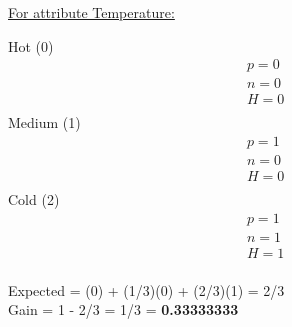 \documentclass[8pt, fullpage,letterpaper]{article}
\begin{document}
\begin{enumerate}
\begin{enumerate}
\begin{enumerate}
\begin{enumerate}
\begin{itemize}
						\underline {For attribute Temperature:} 
							\vspace{-5pt}
							\begin{multicols}{3}
								Hot (0)
			 						\begin{align*}
									    	& p = 0\\
										& n = 0 \\
									    	& H = 0\\
								      \end{align*}
								Medium (1)
			 						\begin{align*}
									    	& p = 1\\
										& n = 0 \\
									    	& H = 0\\
								      \end{align*}
								Cold (2)
			 						\begin{align*}
									    	& p = 1\\
										& n = 1 \\
									    	& H = 1\\
								      \end{align*}
							\end{multicols}
							\vspace{-20pt}
							Expected = (0) + (1/3)(0) + (2/3)(1) = 2/3\\
							Gain = 1 - 2/3 = 1/3 = {\bf 0.33333333}\\


					\centerline{}	
				\end{itemize}	
			\end{enumerate}


\end{enumerate}
\end{enumerate}
\end{enumerate}
\end{document}
